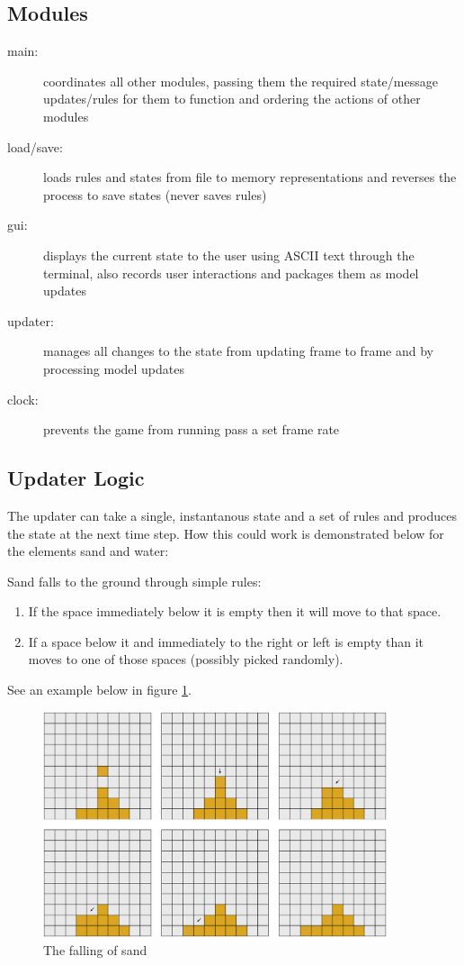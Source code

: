 \subsection{Modules}
\begin{description}
  \item[main:] coordinates all other modules, passing them the required state/message updates/rules for them to function and ordering the actions of other modules
  \item[load/save:] loads rules and states from file to memory representations and reverses the process to save states (never saves rules)
  \item[gui:] displays the current state to the user using ASCII text through the terminal, also records user interactions and packages them as model updates
  \item[updater:] manages all changes to the state from updating frame to frame and by processing model updates
  \item[clock:] prevents the game from running pass a set frame rate
\end{description}

\subsection{Updater Logic}
The updater can take a single, instantanous state and a set of rules and produces the state at
the next time step. How this could work is demonstrated below for the elements sand and water:

Sand falls to the ground through simple rules:
\begin{enumerate}
  \item If the space immediately below it is empty then it will move to that space.
  \item If a space below it and immediately to the right or left is empty than it moves
    to one of those spaces (possibly picked randomly).
\end{enumerate}
See an example below in figure \ref{fig:sand}.

\begin{figure}[H]
  \caption{The falling of sand}
  \label{fig:sand}
  \vspace{3em}
  \center\includegraphics[width=0.9\textwidth]{images/grid_sand}
\end{figure}

